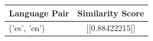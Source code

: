 \begin{tabular}{|l|c|}
\hline
Language Pair & Similarity Score \\
\hline
('es', 'en') & [[0.88422215]] \\
\hline
\end{tabular}

